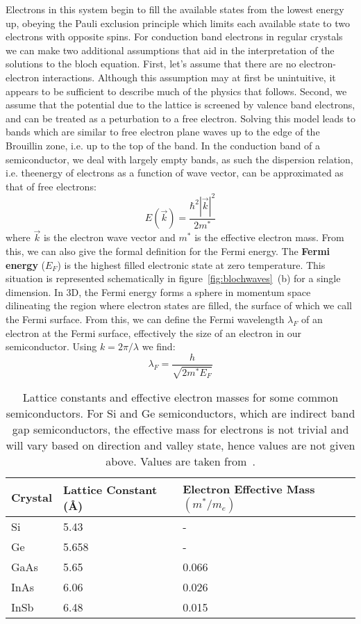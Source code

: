 Electrons in this system begin to fill the available states from the lowest energy up, obeying the Pauli exclusion principle which limits
each available state to two electrons with opposite spins. For conduction band electrons in regular crystals we can make
two additional assumptions that aid in the interpretation of the solutions to the bloch equation. First, let's assume that
there are no electron-electron interactions. Although this assumption may at first be unintuitive, it appears
to be sufficient to describe much of the physics that follows. Second, we assume that the potential due to the
lattice is screened by valence band electrons, and can be treated as a peturbation to a free electron. Solving
this model leads to bands which are similar to free electron plane waves up to the edge of the Brouillin zone, i.e.
up to the top of the band. In the conduction band of a semiconductor, we deal with largely empty bands, as such
the dispersion relation, i.e. theenergy of electrons as a function of wave vector, can be approximated as that of free electrons:
\begin{equation}
  E\left(\vec{k}\right) = \frac{\hbar^2 |\vec{k}|^2}{2m^*}
\end{equation}
where $\vec{k}$ is the electron wave vector and $m^*$ is the effective electron mass. From this, we can also give the
formal definition for the Fermi energy. The \textbf{Fermi energy} ($E_F$) is the highest filled electronic state
at zero temperature. This situation is represented schematically in figure~\ref{fig:blochwaves}~(b) for a single dimension.
In 3D, the Fermi energy forms a sphere in momentum space dilineating the region where electron states are filled, the surface
of which we call the Fermi surface. From this, we can define the Fermi wavelength $\lambda_F$ of an electron at the Fermi
surface, effectively the size of an electron in our semiconductor. Using $k = 2\pi/\lambda$ we find:
\begin{equation}
  \lambda_F = \frac{h}{\sqrt{2m^*E_F}}
\end{equation}

\begin{table}
  \centering
  \begin{tabular}{|l|l|l|}
   \hline
   Crystal & Lattice Constant (\si{\angstrom}) & Electron Effective Mass$(m^*/m_e)$ \\
   \hline
   Si & 5.43 & - \\
   Ge & 5.658 & - \\
   GaAs & 5.65 & 0.066 \\
   InAs & 6.06 & 0.026 \\
   InSb & 6.48 & 0.015 \\
   \hline
  \end{tabular}
  \caption[Properties of some common Semiconductors]
  {Lattice constants and effective electron masses for some common semiconductors. For Si and Ge semiconductors, which are
  indirect band gap semiconductors, the effective mass for electrons is not trivial and will vary based
  on direction and valley state, hence values are not given above. Values are taken from~\cite{Kittel2004,InSbParam}.}
  \label{tab:semiprop}
\end{table}

